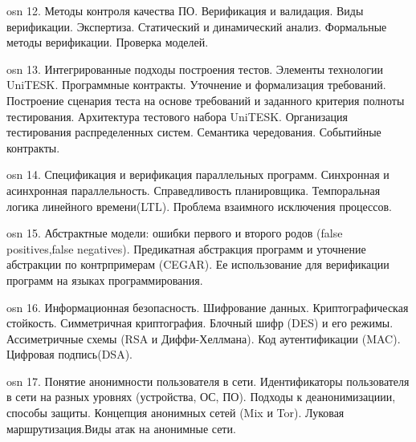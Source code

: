 osn 12. Методы контроля качества ПО. Верификация и валидация. Виды верификации. Экспертиза. Статический и динамический анализ. Формальные методы верификации. Проверка моделей.

osn 13. Интегрированные подходы построения тестов. Элементы технологии UniTESK. Программные контракты. Уточнение и формализация требований. Построение сценария теста на основе требований и заданного критерия полноты тестирования. Архитектура тестового набора UniTESK. Организация тестирования распределенных систем. Семантика чередования.
Событийные контракты.

osn 14. Спецификация и верификация параллельных программ. Синхронная и асинхронная параллельность. Справедливость планировщика. Темпоральная логика линейного времени(LTL). Проблема взаимного исключения процессов.

osn 15. Абстрактные модели: ошибки первого и второго родов (false positives,false negatives). Предикатная абстракция программ и уточнение абстракции по контрпримерам (CEGAR). Ее использование для верификации программ на языках программирования.

osn 16. Информационная безопасность. Шифрование данных. Криптографическая стойкость. Симметричная криптография. Блочный шифр (DES) и его режимы. Ассиметричные схемы (RSA и Диффи-Хеллмана). Код аутентификации (MAC). Цифровая подпись(DSA).

osn 17. Понятие анонимности пользователя в сети. Идентификаторы пользователя в сети на разных уровнях (устройства, ОС, ПО). Подходы к деанонимизациии, способы защиты. Концепция анонимных сетей (Mix и Tor). Луковая маршрутизация.Виды атак на анонимные сети.